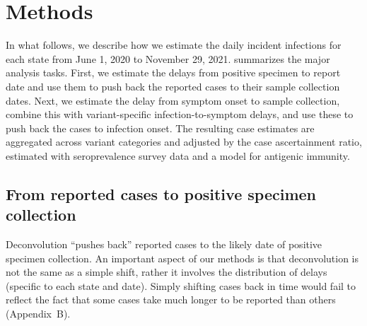 \section{Methods}
\label{sec:methods}


In what follows, we describe how we estimate the daily incident infections for
each \US state from June 1, 2020 to November 29, 2021.
 summarizes the major analysis tasks. First,
we estimate the delays from positive specimen to report date and use them to
push back the reported cases to their sample collection dates. Next, we estimate
the delay from symptom onset to sample collection, combine this with
variant-specific infection-to-symptom delays, and use these to push back the
cases to infection onset. The resulting case estimates are aggregated across
variant categories and adjusted by the case ascertainment ratio, estimated with
seroprevalence survey data and a model for antigenic immunity. 

\subsection{From reported cases to positive specimen collection}
\label{sec:step1}

Deconvolution ``pushes back'' reported cases to the likely date of positive
specimen collection. An important aspect of our methods is that deconvolution is
not the same as a simple shift, rather it involves the distribution of delays
(specific to each state and date). Simply shifting cases back in time would fail
to reflect the fact that some cases take much longer to be reported than others
(Appendix~B).

